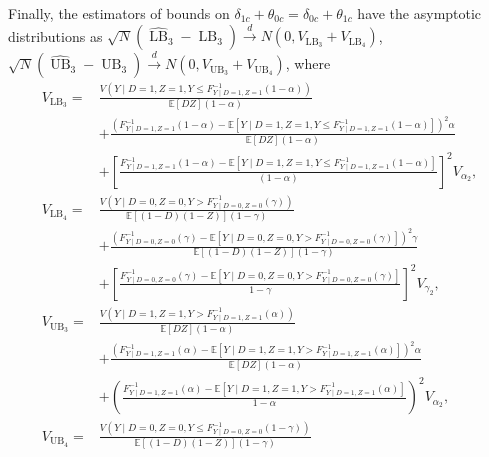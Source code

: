 \documentclass[12pt]{article}
\theoremstyle{plain}
\theoremstyle{definition}
\theoremstyle{remark}
\begin{document}
Finally, the estimators of bounds on $\delta_{1c}+\theta_{0c}=\delta_{0c}+\theta_{1c}$ have the asymptotic distributions as $\sqrt{N} (\widehat{\operatorname{LB}}_3 - \operatorname{LB}_3) \stackrel{d}{\rightarrow} N\left(0, V_{\operatorname{LB}_3} + V_{\operatorname{LB}_4}\right)$, $\sqrt{N} (\widehat{\operatorname{UB}}_3 - \operatorname{UB}_3) \stackrel{d}{\rightarrow} N\left(0, V_{\operatorname{UB}_3} + V_{\operatorname{UB}_4}\right)$, where 
\begin{equation*}
    \begin{aligned}
        V_{\operatorname{LB}_3} =& \frac{V(Y \mid D = 1, Z = 1, Y \leq F^{-1}_{Y \mid D = 1, Z = 1} (1 - \alpha))}{\mathbb{E}[D Z] (1 - \alpha)} \\
        &+ \frac{(F^{-1}_{Y \mid D = 1, Z = 1}(1 - \alpha) - \mathbb{E}[Y \mid D = 1, Z = 1, Y \leq F^{-1}_{Y \mid D = 1, Z = 1} (1 - \alpha)])^2 \alpha}{\mathbb{E}[DZ] (1 - \alpha)} \\
        &+ \left[\frac{F^{-1}_{Y \mid D = 1, Z = 1}(1 - \alpha) - \mathbb{E}[Y \mid D = 1, Z = 1, Y \leq F^{-1}_{Y \mid D = 1, Z = 1} (1 - \alpha)]}{(1 - \alpha)}\right]^2 V_{\alpha_2}, \\
        V_{\operatorname{LB}_4} =& \frac{V(Y \mid D = 0, Z = 0, Y > F^{-1}_{Y \mid D = 0, Z = 0} (\gamma))}{\mathbb{E}[(1 - D)(1 - Z)] (1 - \gamma)} \\
        &+ \frac{(F^{-1}_{Y \mid D = 0, Z = 0} (\gamma) - \mathbb{E}[Y \mid D = 0, Z = 0, Y > F^{-1}_{Y \mid D = 0, Z = 0} (\gamma)])^2 \gamma}{\mathbb{E}[(1 - D)(1 - Z)] (1 - \gamma)} \\
        &+ \left[\frac{F^{-1}_{Y \mid D = 0, Z = 0} (\gamma) - \mathbb{E}[Y \mid D = 0, Z = 0, Y > F^{-1}_{Y \mid D = 0, Z = 0} (\gamma)]}{1 - \gamma}\right]^2 V_{\gamma_2}, \\
        V_{\operatorname{UB}_3} =& \frac{V(Y \mid D = 1, Z = 1, Y > F^{-1}_{Y \mid D = 1, Z = 1} (\alpha))}{\mathbb{E}[D Z] (1 - \alpha)} \\
        &+ \frac{(F^{-1}_{Y \mid D = 1, Z = 1}(\alpha) - \mathbb{E}[Y \mid D = 1, Z = 1, Y > F^{-1}_{Y \mid D = 1, Z = 1} (\alpha)])^2 \alpha}{\mathbb{E}[DZ] (1 - \alpha)} \\
        &+ \left(\frac{F^{-1}_{Y \mid D = 1, Z = 1} (\alpha) - \mathbb{E}[Y \mid D = 1, Z = 1, Y > F^{-1}_{Y \mid D = 1, Z = 1} (\alpha)]}{1 - \alpha}\right)^2 V_{\alpha_2}, \\
        V_{\operatorname{UB}_4} =& \frac{V(Y \mid D = 0, Z = 0, Y \leq F^{-1}_{Y \mid D = 0, Z = 0} (1 - \gamma))}{\mathbb{E}[(1 - D)(1 - Z)] (1 - \gamma)} \\

\end{aligned}
\end{equation*}
\end{document}
